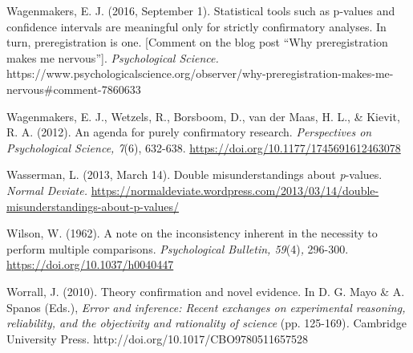 \documentclass[authordate, empirical]{jote-new-article}
\begin{document}
	Wagenmakers, E. J. (2016, September 1). Statistical tools such as p-values and confidence intervals are meaningful only for strictly confirmatory analyses. In turn, preregistration is one. [Comment on the blog post “Why preregistration makes me nervous”]. \emph{Psychological Science.} https://www.psychologicalscience.org/observer/why-preregistration-makes-me-nervous\#comment-7860633



	Wagenmakers, E. J., Wetzels, R., Borsboom, D., van der Maas, H. L., \& Kievit, R. A. (2012). An agenda for purely confirmatory research. \emph{Perspectives on Psychological Science, 7}(6), 632-638. \href{https://www.google.com/url?q=https%3A%2F%2Fdoi.org%2F10.1177%2F1745691612463078&amp;sa=D&amp;sntz=1&amp;usg=AFQjCNE9UTzy_PNf8OKtUSxCBKbDKaAADw}{https://doi.org/10.1177/1745691612463078}



	Wasserman, L. (2013, March 14). Double misunderstandings about \emph{p}-values. \emph{Normal Deviate.} \href{https://normaldeviate.wordpress.com/2013/03/14/double-misunderstandings-about-p-values/}{https://normaldeviate.wordpress.com/2013/03/14/double-misunderstandings-about-p-values/}



	Wilson, W. (1962). A note on the inconsistency inherent in the necessity to perform multiple comparisons. \emph{Psychological Bulletin, 59}(4)\emph{,} 296-300. \href{https://doi.org/10.1037/h0040447}{https://doi.org/10.1037/h0040447}



	Worrall, J. (2010). Theory conﬁrmation and novel evidence. In D. G. Mayo \& A. Spanos (Eds.), \emph{Error and inference: Recent exchanges on experimental reasoning, reliability, and the objectivity and rationality of science }(pp. 125-169)\emph{.} Cambridge University Press. http://doi.org/10.1017/CBO9780511657528
\end{document}

